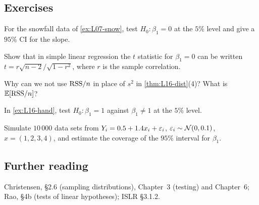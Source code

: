\subsection{Exercises}
\begin{problem}\label{prob:L16-1}
For the snowfall data of \cref{ex:L07-snow}, test $H_0:\beta_1=0$ at the $5\%$ level and give a $95\%$ CI for the slope.
\end{problem}
\begin{problem}\label{prob:L16-2}
Show that in simple linear regression the $t$ statistic for $\beta_1=0$ can be written $t=r\sqrt{n-2}/\sqrt{1-r^2}$, where $r$ is the sample correlation.
\end{problem}
\begin{problem}\label{prob:L16-3}
Why can we not use $\mathrm{RSS}/n$ in place of $s^2$ in \cref{thm:L16-dist}(4)? What is $\mathbb E[\mathrm{RSS}/n]$?
\end{problem}
\begin{problem}\label{prob:L16-4}
In \cref{ex:L16-hand}, test $H_0:\beta_1=1$ against $\beta_1\ne 1$ at the $5\%$ level.
\end{problem}
\begin{problem}\label{prob:L16-5}
Simulate $10\,000$ data sets from $Y_i=0.5+1.4x_i+\varepsilon_i$, $\varepsilon_i\sim\mathcal N(0,0.1)$, $x=(1,2,3,4)$, and estimate the coverage of the $95\%$ interval for $\beta_1$.
\end{problem}

\subsection{Further reading}
Christensen, \S2.6 (sampling distributions), Chapter~3 (testing) and Chapter~6; Rao, \S4b (tests of linear
hypotheses); ISLR \S3.1.2.
